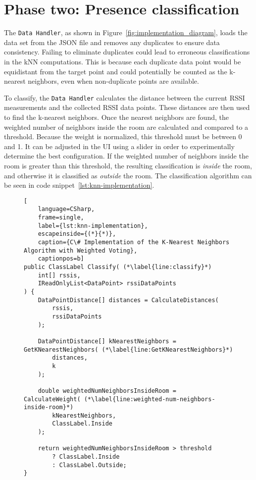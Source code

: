 \section{Phase two: Presence classification}\label{sec:knn_implementation}
The \texttt{Data Handler}, as shown in Figure~\ref{fig:implementation_diagram}, loads the data set from the JSON file and removes any duplicates to ensure data consistency.
Failing to eliminate duplicates could lead to erroneous classifications in the kNN computations.
This is because each duplicate data point would be equidistant from the target point and could potentially be counted as the k-nearest neighbors, even when non-duplicate points are available.

To classify, the \texttt{Data Handler} calculates the distance between the current RSSI measurements and the collected RSSI data points.
These distances are then used to find the k-nearest neighbors.
Once the nearest neighbors are found, the weighted number of neighbors inside the room are calculated and compared to a threshold.
Because the weight is normalized, this threshold must be between 0 and 1.
It can be adjusted in the UI using a slider in order to experimentally determine the best configuration.
If the weighted number of neighbors inside the room is greater than this threshold, the resulting classification is \textit{inside} the room, and otherwise it is classified as \textit{outside} the room.
The classification algorithm can be seen in code snippet~\ref{lst:knn-implementation}.

\begin{figure}[H]
\begin{lstlisting}[
	language=CSharp, 
	frame=single, 
	label={lst:knn-implementation},
	escapeinside={(*}{*)},
	caption={C\# Implementation of the K-Nearest Neighbors Algorithm with Weighted Voting}, 
	captionpos=b] 
public ClassLabel Classify( (*\label{line:classify}*)
	int[] rssis, 
	IReadOnlyList<DataPoint> rssiDataPoints
) {
	DataPointDistance[] distances = CalculateDistances(
		rssis, 
		rssiDataPoints
	);

	DataPointDistance[] kNearestNeighbors = GetKNearestNeighbors( (*\label{line:GetKNearestNeighbors}*)
		distances,
		k
	);

	double weightedNumNeighborsInsideRoom = CalculateWeight( (*\label{line:weighted-num-neighbors-inside-room}*)
		kNearestNeighbors,
		ClassLabel.Inside
	);

	return weightedNumNeighborsInsideRoom > threshold 
		? ClassLabel.Inside 
		: ClassLabel.Outside;
}
\end{lstlisting}
\end{figure}

